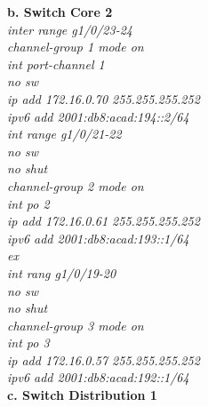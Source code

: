 \documentclass[a4paper, 12pt]{article}
\begin{document}
\hspace*{1cm}\textbf{b. Switch Core 2}\\
\hspace*{2cm}\textit{inter range g1/0/23-24\\
\hspace*{2cm}channel-group 1 mode on\\
\hspace*{2cm}int port-channel 1\\
\hspace*{2cm}no sw\\
\hspace*{2cm}ip add 172.16.0.70 255.255.255.252\\
\hspace*{2cm}ipv6 add 2001:db8:acad:194::2/64\\
\hspace*{2cm}int range g1/0/21-22\\
\hspace*{2cm}no sw\\
\hspace*{2cm}no shut\\
\hspace*{2cm}channel-group 2 mode on\\
\hspace*{2cm}int po 2\\
\hspace*{2cm}ip add 172.16.0.61 255.255.255.252\\
\hspace*{2cm}ipv6 add 2001:db8:acad:193::1/64\\
\hspace*{2cm}ex\\
\hspace*{2cm}int rang g1/0/19-20\\
\hspace*{2cm}no sw\\
\hspace*{2cm}no shut\\
\hspace*{2cm}channel-group 3 mode on\\
\hspace*{2cm}int po 3\\
\hspace*{2cm}ip add 172.16.0.57 255.255.255.252\\
\hspace*{2cm}ipv6 add 2001:db8:acad:192::1/64\\}
\hspace*{1cm}\textbf{c. Switch Distribution 1}\\
\end{document}

